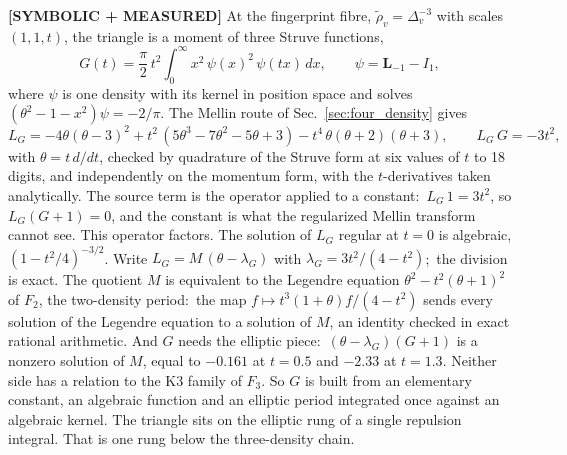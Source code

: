 \documentclass[aps,pra,twocolumn,superscriptaddress,longbibliography]{revtex4-2}
\begin{document}
\textbf{[SYMBOLIC + MEASURED]} At the fingerprint fibre,
$\tilde\rho_v=\Delta_v^{-3}$ with scales $(1,1,t)$, the triangle is a moment
of three Struve functions,
\begin{equation}
  G(t)=\frac{\pi}{2}\,t^2\int_0^\infty x^2\,\psi(x)^2\,\psi(tx)\,dx,
  \qquad \psi=\mathbf{L}_{-1}-I_1 ,
  \label{eq:ring_struve}
\end{equation}
where $\psi$ is one density with its kernel in position space and solves
$(\theta^2-1-x^2)\psi=-2/\pi$.  The Mellin route of
Sec.~\ref{sec:four_density} gives
\begin{equation}
  L_G = -4\theta(\theta-3)^2 + t^2\,(5\theta^3-7\theta^2-5\theta+3)
        - t^4\,\theta(\theta+2)(\theta+3),
  \qquad L_G\,G = -3t^2 ,
  \label{eq:ring_op}
\end{equation}
with $\theta=t\,d/dt$, checked by quadrature of the Struve form at six
values of $t$ to 18 digits, and independently on the momentum form, with the
$t$-derivatives taken analytically.  The source term is the operator applied to a constant:\ $L_G\,1=3t^2$,
so $L_G(G+1)=0$, and the constant is what the regularized Mellin transform
cannot see.  This operator factors.
The solution of $L_G$ regular at $t=0$ is algebraic,
$(1-t^2/4)^{-3/2}$.  Write $L_G=M\,(\theta-\lambda_G)$ with $\lambda_G=3t^2/(4-t^2)$;\ the
division is exact.  The quotient $M$ is equivalent to the Legendre equation
$\theta^2-t^2(\theta+1)^2$ of $F_2$, the two-density period:\ the map
$f\mapsto t^3(1+\theta)f/(4-t^2)$ sends every solution of the Legendre
equation to a solution of $M$, an identity checked in exact rational
arithmetic.  And $G$ needs the elliptic piece:\ $(\theta-\lambda_G)(G+1)$ is a
nonzero solution of $M$, equal to $-0.161$ at $t=0.5$ and $-2.33$ at
$t=1.3$.  Neither side has a relation to the K3 family of $F_3$.
So $G$ is built from an elementary constant, an algebraic function and an elliptic
period integrated once against an algebraic kernel.  The
triangle sits on the elliptic rung of a single repulsion integral.  That is
one rung below the three-density chain.
\end{document}
